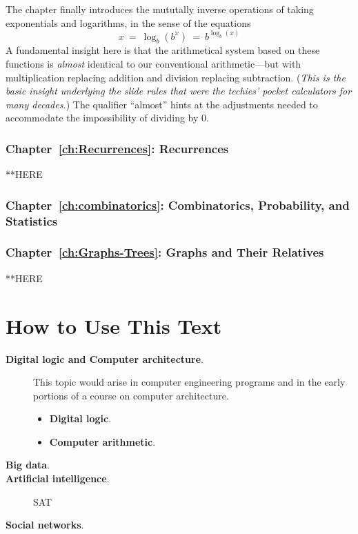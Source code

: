 The chapter finally introduces the mututally inverse operations of
taking exponentials and logarithms, in the sense of the equations
\[  x \ = \ \log_b(b^x) \ = \ b^{\log_b(x)} \]
A fundamental insight here is that the arithmetical system based on
these functions is {\em almost} identical to our conventional
arithmetic---but with multiplication replacing addition and division
replacing subtraction.  ({\em This is the basic insight underlying the
  {\em slide rules} that were the techies' pocket calculators for many
  decades.})  The qualifier ``almost'' hints at the adjustments needed
to accommodate the impossibility of dividing by $0$.


\subsubsection{Chapter~\ref{ch:Recurrences}: Recurrences}


**HERE

\subsubsection{Chapter~\ref{ch:combinatorics}: Combinatorics,
  Probability, and Statistics}


\subsubsection{Chapter~\ref{ch:Graphs-Trees}: Graphs and Their Relatives}




**HERE



\section{How to Use This Text}
\label{sec:how-to-use}

\begin{description}
\item[{\bf Digital logic and Computer architecture}.]
 
This topic would arise in computer engineering programs and in the
early portions of a course on computer architecture.
\begin{itemize}
\item
{\bf Digital logic}. 
\item
{\bf Computer arithmetic}.  
\end{itemize}

\item[{\bf Big data}.]

\item[{\bf Artificial intelligence}.]
SAT

\item[{\bf Social networks}.]

\end{description}





